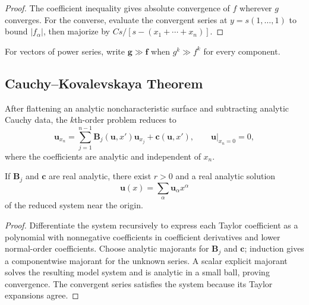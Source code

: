 \begin{proof}
\sketch The coefficient inequality gives absolute convergence of $f$ wherever
$g$ converges. For the converse, evaluate the convergent series at
$y=s(1,\ldots,1)$ to bound $|f_\alpha|$, then majorize by
$Cs/[s-(x_1+\cdots+x_n)]$.
\end{proof}

\begin{remark}
\label{rem:vector-valued-power-series-notation}

For vectors of power series, write $\mathbf g\gg\mathbf f$ when
$g^k\gg f^k$ for every component.
\end{remark}

\subsection{Cauchy--Kovalevskaya Theorem}
\label{sec:cauchy-kovalevskaya-theorem}

After flattening an analytic noncharacteristic surface and subtracting analytic
Cauchy data, the $k$th-order problem reduces to
\[
\mathbf u_{x_n}=\sum_{j=1}^{n-1}\mathbf B_j(\mathbf u,x')\mathbf u_{x_j}
+\mathbf c(\mathbf u,x'),\qquad \mathbf u|_{x_n=0}=0,
\]
where the coefficients are analytic and independent of $x_n$.

\begin{theorem}
\label{thm:cauchy-kovalevskaya}

If $\mathbf B_j$ and $\mathbf c$ are real analytic, there exist $r>0$ and a
real analytic solution
\[
\mathbf u(x)=\sum_\alpha\mathbf u_\alpha x^\alpha
\]
of the reduced system near the origin.
\end{theorem}

\begin{proof}
\sketch Differentiate the system recursively to express each Taylor
coefficient as a polynomial with nonnegative coefficients in coefficient
derivatives and lower normal-order coefficients. Choose analytic majorants
for $\mathbf B_j$ and $\mathbf c$; induction gives a componentwise majorant
for the unknown series. A scalar explicit majorant solves the resulting model
system and is analytic in a small ball, proving convergence. The convergent
series satisfies the system because its Taylor expansions agree.
\end{proof}

